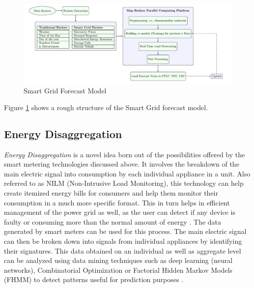 \begin{figure}
	\includegraphics[width=1.0\columnwidth]{images/sg_forecast.pdf}
	\caption{Smart Grid Forecast Model \cite{george07}}
	\label{F:forecast}
\end{figure}
Figure \ref{F:forecast} shows a rough structure of the Smart Grid forecast model.

\subsection{Energy Disaggregation}
{\em Energy Disaggregation} is a novel idea born out of the possibilities offered by the smart metering technologies discussed above. It involves the breakdown of the main electric signal into consumption by each individual appliance in a unit. Also referred to as NILM (Non-Intrusive Load Monitoring), this technology can help create itemized energy bills for consumers and help them monitor their consumption in a much more specific format. This in turn helps in efficient management of the power grid as well, as the user can detect if any device is faulty or consuming more than the normal amount of energy \cite{wan08}. The data generated by smart meters can be used for this process. The main electric signal can then be broken down into signals from individual appliances by identifying their signatures. This data obtained on an individual as well as aggregate level can be analyzed using data mining techniques such as deep learning (neural networks), Combinatorial Optimization or Factorial Hidden Markov Models (FHMM) to detect patterns useful for prediction purposes \cite{wan08}.

